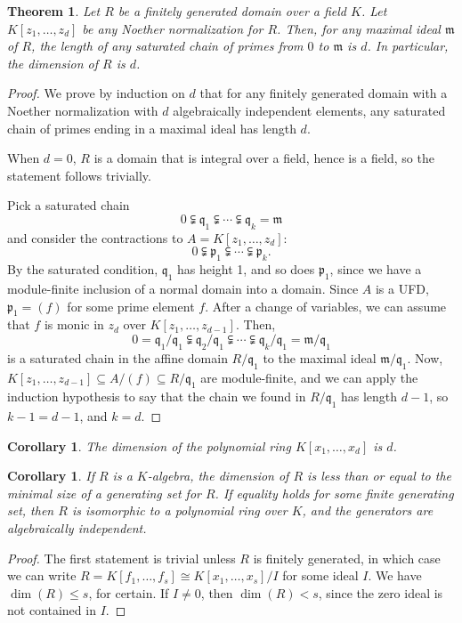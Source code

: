 \documentclass{amsart}[12pt]
\newcommand{\p}{{\mathfrak p}}
\newcommand{\m}{{\mathfrak m}}
\newcommand{\q}{{\mathfrak q}}
\numberwithin{equation}{section}
\theoremstyle{plain} %
\newtheorem{theorem}[equation]{Theorem}
\newtheorem{corollary}[equation]{Corollary}
\theoremstyle{definition}
\theoremstyle{remark}
\begin{document}
	
	

\begin{theorem} Let $R$ be a finitely generated domain over a field $K$. Let $K[z_1,\dots,z_d]$ be any Noether normalization for $R$. Then, for any maximal ideal $\m$ of $R$, the length of any saturated chain of primes from $0$ to $\m$ is $d$. In particular, the dimension of $R$ is $d$.
	\end{theorem}
\begin{proof}
	We prove by induction on $d$ that for any finitely generated domain with a Noether normalization with $d$ algebraically independent elements, any saturated chain of primes ending in a maximal ideal has length $d$.
	
	When $d=0$, $R$ is a domain that is integral over a field, hence is a field, so the statement follows trivially.
	
	Pick a saturated chain
	\[ 0 \subsetneqq \q_1 \subsetneqq\cdots \subsetneqq  \q_k = \m \]
	and consider the contractions to $A=K[z_1,\dots,z_d]$:
		\[ 0 \subsetneqq \p_1 \subsetneqq\cdots \subsetneqq  \p_k. \]
	By the saturated condition, $\q_1$ has height 1, and so does $\p_1$, since we have a module-finite inclusion of a normal domain into a domain. Since $A$ is a UFD, $\p_1=(f)$ for some prime element $f$. After a change of variables, we can assume that $f$ is monic in $z_d$ over $K[z_1,\dots,z_{d-1}]$. Then,
	\[ 0 = \q_1/\q_1 \subsetneqq \q_2/\q_1 \subsetneqq \cdots\subsetneqq  \q_k/\q_1 =\m/\q_1 \]
	is a saturated chain in the affine domain $R/\q_1$ to the maximal ideal $\m/\q_1$. Now, $K[z_1,\dots,z_{d-1}] \subseteq A/(f) \subseteq R/\q_1$ are module-finite, and we can apply the induction hypothesis to say that the chain we found in $R/\q_1$ has length $d-1$, so $k-1=d-1$, and $k=d$.

\end{proof}

\begin{corollary} The dimension of the polynomial ring $K[x_1,\dots,x_d]$ is $d$.
\end{corollary}

\begin{corollary}
	If $R$ is a $K$-algebra, the dimension of $R$ is less than or equal to the minimal size of a generating set for $R$. If equality holds for some finite generating set, then $R$ is isomorphic to a polynomial ring over $K$, and the generators are algebraically independent.
	\end{corollary}
	\begin{proof}
	The first statement is trivial unless $R$ is finitely generated, in which case we can write $R=K[f_1,\dots,f_s] \cong K[x_1,\dots,x_s]/I$ for some ideal $I$. We have $\dim(R)\leq s$, for certain. If $I\neq 0$, then $\dim(R)< s$, since the zero ideal is not contained in $I$.
	\end{proof}
	
\end{document}

